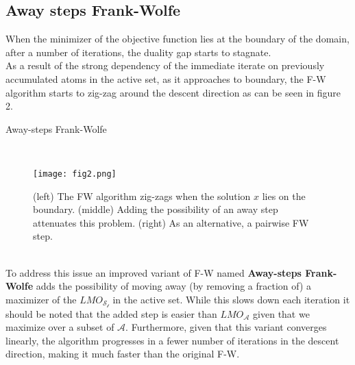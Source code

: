 \documentclass{article}
\begin{document}
\subsection{Away steps Frank-Wolfe}
When the minimizer of the objective function lies at the boundary of the domain, after a number of iterations, the duality gap starts to stagnate.\\
As a result of the strong dependency of the immediate iterate on previously accumulated atoms in the active set, as it approaches to boundary, the F-W algorithm starts to zig-zag around the descent direction as can be seen in figure 2.\\
\begin{algorithm}[tb]
   \caption{Away-steps Frank-Wolfe}
   \label{alg:example}
\begin{algorithmic}
    \\
    \ENDFOR
\end{algorithmic}
\end{algorithm}
\begin{figure}
  \texttt{[image: fig2.png]}
  \caption{(left) The FW algorithm zig-zags when the solution $x$ lies on the boundary. (middle) Adding the possibility of an away step attenuates this problem. (right) As an alternative, a pairwise FW step.}
  \label{fig:Away steps}
\end{figure}
\\
To address this issue an improved variant of F-W named \textbf{Away-steps Frank-Wolfe} adds the possibility of moving away (by removing a fraction of) a maximizer of the $LMO_{\mathcal{S_{t}}}$ in the active set. While this slows down each iteration it should be noted that the added step is easier than $LMO_{\mathcal{A}}$ given that we maximize over a subset of $\mathcal{A}$. Furthermore, given that this variant converges linearly, the algorithm progresses in a fewer number of iterations in the descent direction, making it much faster than the original F-W.
\end{document}
